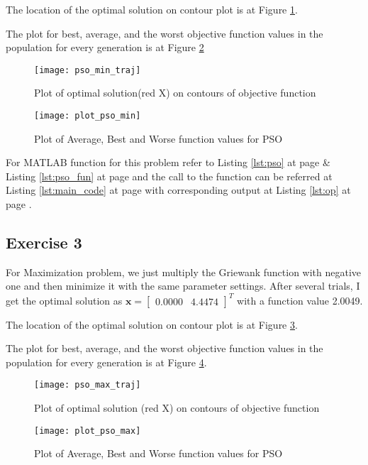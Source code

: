 \documentclass[11pt]{article}
\newcommand{\V}[1]{\pmb{#1}}
\newcommand{\mat}[1]{\begin{bmatrix}#1\end{bmatrix}}
\newcommand{\reflst}[1]{Listing \ref{#1} at page \pageref{#1}}
\newcommand{\reffig}[1]{Figure \ref{#1}}
\begin{document}
\noindent The location of the optimal solution on contour plot is at \reffig{fig:pso_min_cont}.

\noindent The plot for best, average, and the worst objective function values in the population for every generation is at \reffig{fig:pso_min}

\begin{figure}[!h]
 \centering
 \texttt{[image: pso\_min\_traj]}
 \caption{Plot of optimal solution(red X) on contours of objective function}
 \label{fig:pso_min_cont}
\end{figure}

\begin{figure}[!h]
 \centering
 \texttt{[image: plot\_pso\_min]}
 \caption{Plot of Average, Best and Worse function values for PSO}
 \label{fig:pso_min}
\end{figure}

\noindent For MATLAB function for this problem refer to \reflst{lst:pso} \& \reflst{lst:pso_fun} and the call to the function can be referred at \reflst{lst:main_code} with corresponding output at \reflst{lst:op}.
%
\clearpage
\vspace{2ex}
%
\subsection*{Exercise 3}
For Maximization problem, we just multiply the Griewank function with negative one and then minimize it with the same parameter settings. After several trials, I get the optimal solution as $\V{x}=\mat{   0.0000 &    4.4474}^T$ with a function value 2.0049. 

\noindent The location of the optimal solution on contour plot is at \reffig{fig:pso_max_cont}.

\noindent The plot for best, average, and the worst objective function values in the population for every generation is at \reffig{fig:pso_max}.

\begin{figure}[!h]
 \centering
 \texttt{[image: pso\_max\_traj]}
 \caption{Plot of optimal solution (red X) on contours of objective function}
 \label{fig:pso_max_cont}
\end{figure}

\begin{figure}[!h]
 \centering
 \texttt{[image: plot\_pso\_max]}
 \caption{Plot of Average, Best and Worse function values for PSO}
 \label{fig:pso_max}
\end{figure}
\end{document}
